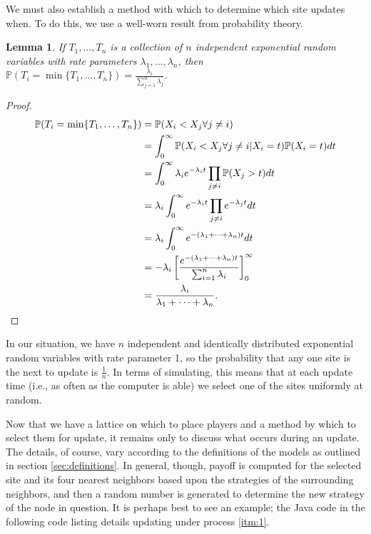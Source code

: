 \documentclass[notitlepage,reqno]{amsart}
\newcommand{\pr}{\mathbb{P}}
\newtheorem{lem}{Lemma}
\begin{document}
We must also establish a method with which to determine which site
updates when. To do this, we use a well-worn result from probability theory.

\begin{lem}
  If $T_1,\dots, T_n$ is a collection of $n$ independent exponential
  random variables with rate parameters $\lambda_1,\dots, \lambda_n$,
  then $\displaystyle\pr\left( T_i =
  \min\{T_1,\dots, T_n\} \right) = \frac{\lambda_i}{\sum_{j=1}^n\lambda_j}$.
\end{lem}
\label{lem:minofexponentials}

\begin{proof}
\begin{align*}
  \pr(T_i = \min\{T_1,\dots,T_n\}) &= \pr(X_i<X_j \forall j\neq i) \\
  &= \int_0^\infty \pr(X_i<X_j\forall j\neq i | X_i=t) \pr(X_i=t)dt \\
  &= \int_0^\infty \lambda_i e^{-\lambda_i t}\prod_{j\neq i} \pr(X_j >
  t) dt \\
  &= \lambda_i \int_0^\infty e^{-\lambda_i t}\prod_{j\neq i}
  e^{-\lambda_j t} dt \\
  &= \lambda_i \int_0^\infty e^{-(\lambda_1+\dots+\lambda_n)t} dt \\
  &= -\lambda_i \left[
    \frac{e^{-(\lambda_1+\dots+\lambda_n)t}}{\sum_{i=1}^n \lambda_i}
  \right]_0^\infty \\
  &= \frac{\lambda_i}{\lambda_1+\dots+\lambda_n}. \qedhere
\end{align*}
\end{proof}

In our situation, we have $n$ independent and identically distributed
exponential random variables with rate parameter 1, so the probability
that any one site is the next to update is $\frac{1}{n}$. In terms of
simulating, this means that at each update time (i.e., as often as
the computer is able) we select one of the sites uniformly at random.

Now that we have a lattice on which to place players and a method by
which to select them for update, it remains only to discuss what
occurs during an update. The details, of course, vary according to the
definitions of the models as outlined in section
\ref{sec:definitions}. In general, though, payoff is computed for the
selected site and its four nearest neighbors based upon the
strategies of the surrounding neighbors, and then a random number is
generated to determine the new strategy of the node in question. It is
perhaps best to see an example; the Java code in the following code listing details updating under process \ref{itm:1}.
\end{document}
